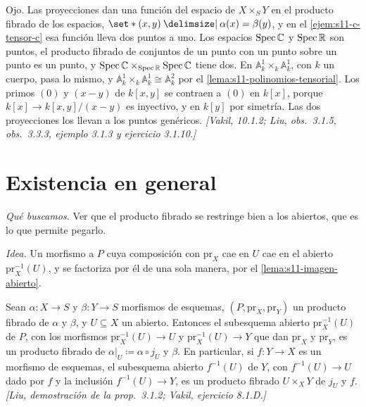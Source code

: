 \begin{obs}
\label{obs:s11-espacio-producto}
Ojo. Las proyecciones dan una función del espacio de \(X\times_S Y\) en el producto fibrado de los espacios, \(\set*{(x,y)\given\alpha(x)=\beta(y)}\), y en el \cref{ejem:s11-c-tensor-c} esa función lleva dos puntos a uno. Los espacios \(\operatorname{Spec}\mathbb C\) y \(\operatorname{Spec}\mathbb R\) son puntos, el producto fibrado de conjuntos de un punto con un punto sobre un punto es un punto, y \(\operatorname{Spec}\mathbb C\times_{\operatorname{Spec}\mathbb R}\operatorname{Spec}\mathbb C\) tiene dos. En \(\mathbb A_k^1\times_k\mathbb A_k^1\), con \(k\) un cuerpo, pasa lo mismo, y \(\mathbb A_k^1\times_k\mathbb A_k^1\cong\mathbb A_k^2\) por el \cref{lema:s11-polinomios-tensorial}. Los primos \((0)\) y \((x-y)\) de \(k[x,y]\) se contraen a \((0)\) en \(k[x]\), porque \(k[x]\to k[x,y]/(x-y)\) es inyectivo, y en \(k[y]\) por simetría. Las dos proyecciones los llevan a los puntos genéricos. \emph{[Vakil, 10.1.2; Liu, obs.~3.1.5, obs.~3.3.3, ejemplo 3.1.3 y ejercicio 3.1.10.]}
\end{obs}

\section{Existencia en general}
\label{sec:s11-existencia}

\emph{Qué buscamos.} Ver que el producto fibrado se restringe bien a los abiertos, que es lo que permite pegarlo.

\emph{Idea.} Un morfismo a \(P\) cuya composición con \(\mathrm{pr}_X\) cae en \(U\) cae en el abierto \(\mathrm{pr}_X^{-1}(U)\), y se factoriza por él de una sola manera, por el \cref{lema:s11-imagen-abierto}.

\begin{afirm}
\label{afirm:s11-restrccion-abiertos}
Sean \(\alpha\colon X\to S\) y \(\beta\colon Y\to S\) morfismos de esquemas, \((P,\mathrm{pr}_X,\mathrm{pr}_Y)\) un producto fibrado de \(\alpha\) y \(\beta\), y \(U\subseteq X\) un abierto. Entonces el subesquema abierto \(\mathrm{pr}_X^{-1}(U)\) de \(P\), con los morfismos \(\mathrm{pr}_X^{-1}(U)\to U\) y \(\mathrm{pr}_X^{-1}(U)\to Y\) que dan \(\mathrm{pr}_X\) y \(\mathrm{pr}_Y\), es un producto fibrado de \(\alpha|_U\coloneqq\alpha\circ j_U\) y \(\beta\). En particular, si \(f\colon Y\to X\) es un morfismo de esquemas, el subesquema abierto \(f^{-1}(U)\) de \(Y\), con \(f^{-1}(U)\to U\) dado por \(f\) y la inclusión \(f^{-1}(U)\to Y\), es un producto fibrado \(U\times_X Y\) de \(j_U\) y \(f\). \emph{[Liu, demostración de la prop.~3.1.2; Vakil, ejercicio 8.1.D.]}
\end{afirm}

